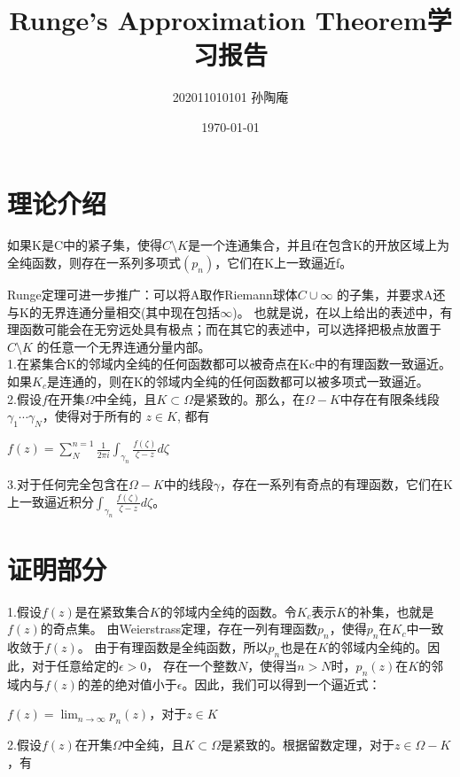 \documentclass[12pt, a4paper, oneside]{article}
\title{Runge's Approximation Theorem学习报告}
\date{\today}
\author{202011010101 孙陶庵}
\begin{document}
\begin{spacing}{2.0}
\maketitle

\section{理论介绍}
如果K是C中的紧子集，使得$C\setminus K$是一个连通集合，并且f在包含K的开放区域上为全纯函数，则存在一系列多项式$(p_{n})$，它们在K上一致逼近f。

Runge定理可进一步推广：可以将A取作Riemann球体$C\cup{\infty}$ 的子集，并要求A还与K的无界连通分量相交(其中现在包括$\infty$)。
也就是说，在以上给出的表述中，有理函数可能会在无穷远处具有极点；而在其它的表述中，可以选择把极点放置于$C\setminus K$ 的任意一个无界连通分量内部。\\

1.在紧集合K的邻域内全纯的任何函数都可以被奇点在Kc中的有理函数一致逼近。如果$K_c$是连通的，则在K的邻域内全纯的任何函数都可以被多项式一致逼近。\\
2.假设$f$在开集$\Omega$中全纯，且$K \subset  \Omega$是紧致的。那么，在$\Omega - K$中存在有限条线段$\gamma_1\cdots\gamma_N$，使得对于所有的 $z\in K$, 都有

\begin{center}
    $f(z) = \displaystyle\sum_{N}^{n = 1}\frac{1}{2\pi i}\displaystyle\int_{\gamma_n}\frac{f(\zeta)}{\zeta - z}d\zeta$
\end{center}
3.对于任何完全包含在$\Omega-K$中的线段$\gamma$，存在一系列有奇点的有理函数，它们在K上一致逼近积分$\displaystyle\int_{\gamma_n}\frac{f(\zeta)}{\zeta - z}d\zeta$。
\section{证明部分}
1.假设$f(z)$是在紧致集合$K$的邻域内全纯的函数。令$K_c$表示$K$的补集，也就是$f(z)$的奇点集。
由Weierstrass定理，存在一列有理函数${p_n}$，使得$p_n$在$K_c$中一致收敛于$f(z)$。
由于有理函数是全纯函数，所以$p_n$也是在$K$的邻域内全纯的。因此，对于任意给定的$\epsilon > 0$，
存在一个整数$N$，使得当$n > N$时，$p_n(z)$在$K$的邻域内与$f(z)$的差的绝对值小于$\epsilon$。因此，我们可以得到一个逼近式：
\begin{center}
    $f(z) = \displaystyle\lim_{n \to \infty}p_n(z)$，对于$z\in K$
\end{center}

    
2.假设$f(z)$在开集$\Omega$中全纯，且$K \subset \Omega$是紧致的。根据留数定理，对于$z\in \Omega - K$，有


\end{spacing}
\end{document}
